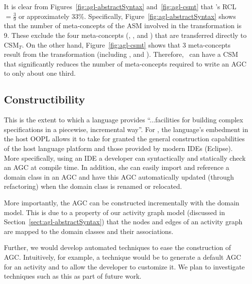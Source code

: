 It is clear from Figures~\ref{fig:agl-abstractSyntax} and~\ref{fig:agl-csmt} that \agl's RCL $ = \frac{3}{9}$ or approximately 33\%. Specifically, Figure~\ref{fig:agl-abstractSyntax} shows that the number of meta-concepts of the ASM involved in the transformation is 9. These exclude the four meta-concepts (, ,  and ) that are transferred directly to CSM$_T$. On the other hand, Figure~\ref{fig:agl-csmt} shows that 3 meta-concepts result from the transformation (including ,  and ). Therefore, \agl~can have a CSM that significantly reduces the number of meta-concepts required to write an AGC to only about one third. 
%
\subsection{Constructibility} \label{sect:eval-construct}
This is the extent to which a language provides ``...facilities for building complex specifications in a piecewise, incremental way''\cite{lamsweerde_formal_2000}. For \agl, the language's embedment in the host OOPL allows it to take for granted the general construction capabilities of the host language platform and those provided by modern IDEs (\eg Eclipse). More specifically, using an IDE a developer can syntactically and statically check an AGC at compile time. In addition, she can easily import and reference a domain class in an AGC and have this AGC automatically updated (through refactoring) when the domain class is renamed or relocated.

More importantly, the AGC can be constructed incrementally with the domain model. This is due to a property of our activity graph model (discussed in Section~\ref{sect:agl-abstractSyntax}) that the nodes and edges of an activity graph are mapped to the domain classes and their associations.

Further, we would develop automated techniques to ease the construction of AGC. Intuitively, for example, a technique would be to generate a default AGC for an activity and to allow the developer to customize it. We plan to investigate techniques such as this as part of future work.